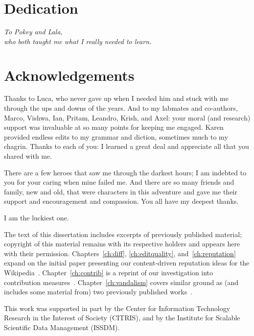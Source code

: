 \chapter{Dedication}

\vspace*{\fill}

\begin{center}
\textit{%
To Pokey and Lala, \\
who both taught me what I really needed to learn.
}
\end{center}

\vspace{1in}

\begin{center}
\Heart\quad\Heart\quad\Heart
\end{center}

\vspace*{\fill}

\chapter{Acknowledgements}

Thanks to Luca, who never gave up when I needed him and stuck with
me through the ups and downs of the years.
And to my labmates and co-authors, Marco, Vishwa, Ian, Pritam, Leandro, Krish,
and Axel: your moral (and research) support
was invaluable at so many points for keeping me engaged.
Karen provided endless edits to my grammar and diction, sometimes
much to my chagrin.
Thanks to each of you: I learned a great deal and appreciate all that
you shared with me.

There are a few heroes that saw me through the darkest hours;
I am indebted to you for your caring when mine failed me.
And there are so many friends and family, new and old,
that were characters in this adventure and gave me their
support and encouragement and compassion.
You all have my deepest thanks.



\vspace{.25in}
\begin{center}
I am the luckiest one.
\end{center}

\vfill

The text of this dissertation includes excerpts of
previously published material; copyright of this material
remains with its respective holders and appears here with their permission.
Chapters~\ref{ch:diff}, \ref{ch:editquality}, and~\ref{ch:reputation}
expand on the initial paper presenting our content-driven reputation
ideas for the Wikipedia~\cite{Adler2007}.
Chapter~\ref{ch:contrib} is a reprint of our investigation into
contribution measures~\cite{Adler2008a}.
Chapter~\ref{ch:vandalism} covers similar ground as (and includes
some material from) two previously
published works~\cite{Adler2010b,Adler2011a}.

This work was supported in part by the Center for Information
Technology Research in the Interest of Society (CITRIS), and
by the Institute for Scalable Scientific Data Management (ISSDM).


